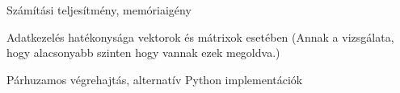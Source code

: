 
Számítási teljesítmény, memóriaigény

Adatkezelés hatékonysága vektorok és mátrixok esetében
(Annak a vizsgálata, hogy alacsonyabb szinten hogy vannak ezek megoldva.)

Párhuzamos végrehajtás, alternatív Python implementációk
